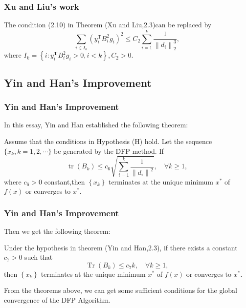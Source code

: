 \documentclass{beamer}
\begin{document}
\begin{frame}
\frametitle{Xu and Liu's work}
\begin{theorem}
The condition (2.10) in Theorem (Xu and Liu,2.3)can be replaced by \begin{equation*}
    \sum_{i \in I_k}\left(y_i^{\mathrm{T}} B_i^2 g_i\right)^2 \leq C_2 \sum_{i=1}^k \frac{1}{\left\|d_i\right\|_2^3},
\end{equation*}
where $I_k=\left\{i: y_i^{\mathbf{T}} B_i^2 g_i>0, i<k\right\}, C_2>0$.
\end{theorem}

\end{frame}



\subsection{Yin and Han's Improvement}

\begin{frame}
\frametitle{Yin and Han's Improvement}
In this essay, Yin and Han established the following theorem:
\begin{theorem}
Assume that the conditions in Hypothesis (H) hold. Let the sequence $\{x_{k}, k=1,2, \cdots\}$ be generated by the DFP method. If
\begin{equation*}
    \operatorname{tr}\left(B_k\right) \leq c_6 \sqrt{\sum_{i=1}^k \frac{1}{\left\|d_i\right\|^2}}, \quad \forall k \geq 1, \tag{2.14}
\end{equation*}
where $c_6>0$ constant,then $\left\{x_k\right\}$ terminates at the unique minimum $x^{*}$ of $f(x)$ or converges to $x^{*}$.
\end{theorem}
    
\end{frame}

\begin{frame}
\frametitle{Yin and Han's Improvement}
Then we get the following theorem:
\begin{theorem}
    Under the hypothesis in theorem (Yin and Han,2.3), if there exists a constant $c_7>0$ such that \begin{equation*}
        \operatorname{Tr}\left(B_k\right) \leq c_7 k, \quad \forall k \geq 1,
    \end{equation*}
then $\left\{x_k\right\}$ terminates at the unique minimum $x^{*}$ of $f(x)$ or converges to $x^{*}$.
\end{theorem}
    From the theorems above, we can get some sufficient conditions for the global convergence of the DFP Algorithm.
\end{frame}
\end{document}
